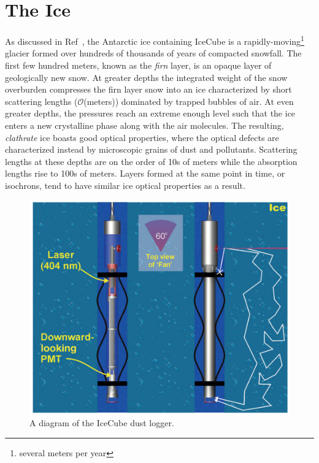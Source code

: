 \documentclass[main.tex]{subfiles}
\begin{document}

\section{The Ice}\label{sec:the_ice_stuff}
As discussed in Ref~\cite{journal_glaciology_2013}, the Antarctic ice containing IceCube is a rapidly-moving\footnote{several meters per year} glacier formed over hundreds of thousands of years of compacted snowfall. 
The first few hundred meters, known as the \textit{firn} layer, is an opaque layer of geologically new snow. 
At greater depths the integrated weight of the snow overburden compresses the firn layer snow into an ice characterized by short scattering lengths ($\mathcal{O}$(meters)) dominated by trapped bubbles of air.
At even greater depths, the pressures reach an extreme enough level such that the ice enters a new crystalline phase along with the air molecules. 
The resulting, \textit{clathrate} ice boasts good optical properties, where the optical defects are characterized instead by microscopic grains of dust and pollutants.
Scattering lengths at these depths are on the order of 10s of meters while the absorption lengths rise to 100s of meters. 
Layers formed at the same point in time, or isochrons, tend to have similar ice optical properties as a result. 

\begin{figure}
    \centering
    \includegraphics[width=0.6\linewidth]{figures/dustlog.png}
    \caption{A diagram of the IceCube dust logger.}\label{fig:dustlog}
\end{figure}
\end{document}
